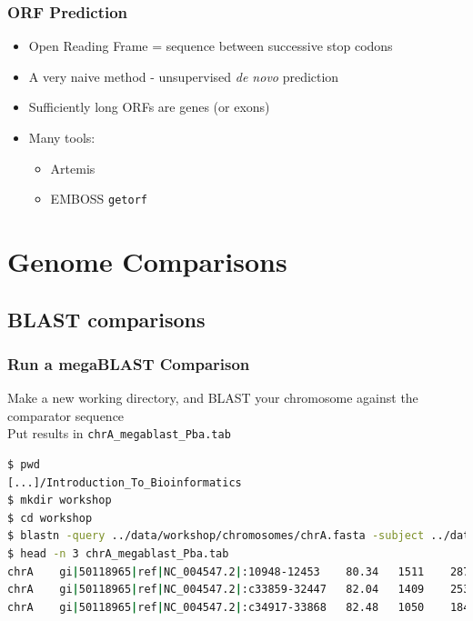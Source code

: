 \documentclass[table]{beamer}
\begin{document}
    \begin{frame}
     \frametitle{ORF Prediction}
     \begin{itemize}
       \item Open Reading Frame = sequence between successive stop codons
       \item A very naive method - unsupervised \textit{de novo} prediction
       \item Sufficiently long ORFs are genes (or exons)
       \item Many tools:
       \begin{itemize}
         \item Artemis
         \item EMBOSS \texttt{getorf}
       \end{itemize}
     \end{itemize}
    \end{frame}  



\section{Genome Comparisons}

  \subsection{BLAST comparisons}
  \begin{frame}[fragile]
    \frametitle{Run a megaBLAST Comparison}
    Make a new working directory, and BLAST your chromosome against the comparator sequence \\
    Put results in \texttt{chrA\_megablast\_Pba.tab}
    \begin{lstlisting}[language=bash]
$ pwd
[...]/Introduction_To_Bioinformatics
$ mkdir workshop
$ cd workshop
$ blastn -query ../data/workshop/chromosomes/chrA.fasta -subject ../data/workshop/chromosomes/NC_004547.ffn -out chrA_megablast_Pba.tab -outfmt 6 
$ head -n 3 chrA_megablast_Pba.tab 
chrA	gi|50118965|ref|NC_004547.2|:10948-12453	80.34	1511	287	10	4579450	4580955	1506	1	0.0	1136
chrA	gi|50118965|ref|NC_004547.2|:c33859-32447	82.04	1409	253	0	4563151	4564559	1	1409	0.0	1201
chrA	gi|50118965|ref|NC_004547.2|:c34917-33868	82.48	1050	184	0	4562093	4563142	1	1050	0.0	 920
    \end{lstlisting}
\end{frame} 
    
\end{document}
